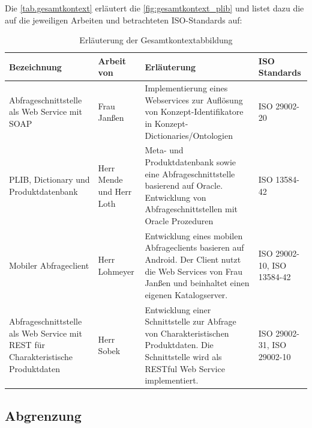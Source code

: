 Die \autoref{tab.gesamtkontext} erläutert die \autoref{fig:gesamtkontext_plib} und listet dazu die auf die jeweiligen Arbeiten und betrachteten ISO-Standards auf: 

\begin{table}[!hbt]\vspace{1ex}\centering
\scriptsize
\begin{tabular}{p{3.15cm}p{2.8cm}p{5.5cm}p{3cm}}
\toprule \rowcolor{mylightergray}
\textbf{Bezeichnung} & \textbf{Arbeit von} & \textbf{Erläuterung} &  \textbf{ISO Standards}\\
\midrule
Abfrageschnittstelle als Web Service mit SOAP &  Frau Janßen & Implementierung eines Webservices zur Auflösung von Konzept-Identifikatore in Konzept-Dictionaries/Ontologien & ISO 29002-20 \\
\hline
PLIB, Dictionary und Produktdatenbank &  Herr Mende und Herr Loth & Meta- und Produktdatenbank  sowie eine Abfrageschnittstelle basierend auf Oracle. Entwicklung von Abfrageschnittstellen mit Oracle Prozeduren & ISO 13584-42 \citep[Vergl.][]{iso13584-42}  \\
\hline
Mobiler Abfrageclient & Herr Lohmeyer & Entwicklung eines mobilen Abfrageclients basieren auf Android. Der Client nutzt die Web Services von Frau Janßen und beinhaltet einen eigenen Katalogserver. & ISO 29002-10, ISO 13584-42 \\
\hline
Abfrageschnittstelle als Web Service mit REST für Charakteristische Produktdaten & Herr Sobek & Entwicklung einer Schnittstelle zur Abfrage von Charakteristischen Produktdaten. Die Schnittstelle wird als RESTful Web Service implementiert. & ISO 29002-31, ISO 29002-10 \\
\bottomrule
\end{tabular}
\caption{\label{tab.gesamtkontext}Erläuterung der Gesamtkontextabbildung}
\vspace{2ex}\end{table}

\subsection{Abgrenzung}

